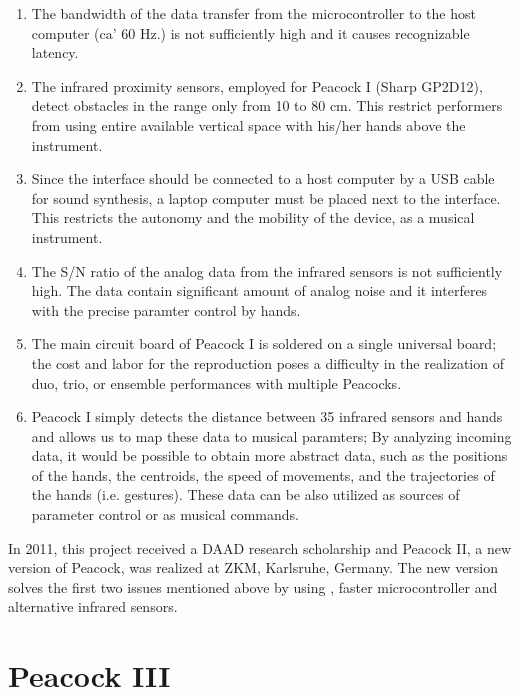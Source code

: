 \documentclass{nime-alternate}
\begin{document}
\begin{enumerate}
\item The bandwidth of the data transfer from the microcontroller to the host computer (ca' 60 Hz.) is not sufficiently high and it causes recognizable latency.

\item The infrared proximity sensors, employed for Peacock I (Sharp GP2D12), detect obstacles in the range only from 10 to 80 cm. This restrict performers from using entire available vertical space with his/her hands above the instrument. 

\item Since the interface should be connected to a host computer by a USB cable for sound synthesis, a laptop computer must be placed next to the interface. This restricts the autonomy and the mobility of the device, as a musical instrument.

\item The S/N ratio of the analog data from the infrared sensors is not sufficiently high. The data contain significant amount of analog noise and it interferes with the precise paramter control by hands.

\item The main circuit board of Peacock I is soldered on a single universal board; the cost and labor for the reproduction poses a difficulty in the realization of duo, trio, or ensemble performances with multiple Peacocks.

\item Peacock I simply detects the distance between 35 infrared sensors and hands and allows us to map these data to musical paramters; By analyzing incoming data, it would be possible to obtain more abstract data, such as the  positions of the hands, the centroids, the speed of movements, and the trajectories of the hands (i.e. gestures). These data can be also utilized as sources of parameter control or as musical commands.

\end{enumerate}

In 2011, this project received a DAAD research scholarship and Peacock II, a new version of Peacock, was realized at ZKM, Karlsruhe, Germany. The new version solves the first two issues mentioned above by using , faster microcontroller\cite{parallax:propeller} and alternative infrared sensors.


\section{Peacock III}
\end{document}
